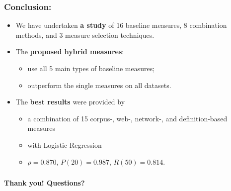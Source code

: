 \documentclass{beamer}
\begin{document}
\begin{frame}
\frametitle{Conclusion:}

\begin{itemize}
  

\item We have undertaken \textbf{a study} of 16 baseline measures, 8
combination methods, and 3 measure selection techniques.

\item The \textbf{proposed hybrid measures}:


\begin{itemize}
  \item use all 5 main types of baseline measures;
  \item outperform the single measures on all datasets.
\end{itemize}  

  
\item The \textbf{best results} were provided by
\begin{itemize}
  \item  a combination of 15  corpus-, web-, network-, and definition-based measures
\item with Logistic Regression 
\item $\rho= 0.870$, $P(20)=0.987$, $R(50)=0.814$.
\end{itemize}
 
\end{itemize}

\end{frame}

\begin{frame}
\frametitle{}

\Huge \bf Thank you! Questions?
\end{frame}
\end{document}
